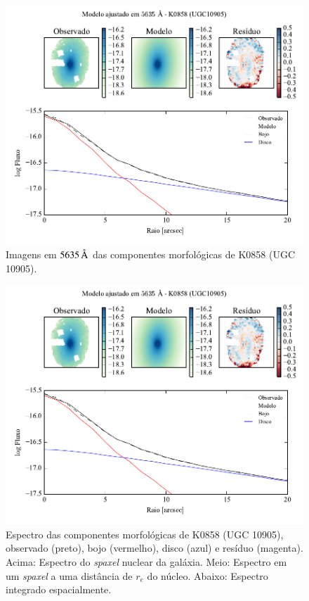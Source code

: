 \begin{figure}
	\includegraphics[page=3]{figuras-decomp/K0858_sample006a}
	\caption[Imagens em $5635\,\angstrom$ das componentes morfológicas de K0858
	(UGC 10905)]
	{Imagens em $5635\,\angstrom$ das componentes morfológicas de K0858
	(UGC 10905).}
	\label{fig:decompImages:K0858}
\end{figure}

\begin{figure}
	\includegraphics[page=4]{figuras-decomp/K0858_sample006a}
	\caption[Espectro das componentes morfológicas de K0858 (UGC 10905)]
	{Espectro das componentes morfológicas de K0858 (UGC 10905),
	observado (preto), bojo (vermelho), disco (azul) e resíduo (magenta). Acima:
	Espectro do {\em spaxel} nuclear da galáxia. Meio: Espectro em um {\em spaxel}
	a uma distância de $r_e$ do núcleo. Abaixo: Espectro integrado espacialmente.}
	\label{fig:decompSpectra:K0858}
\end{figure}

